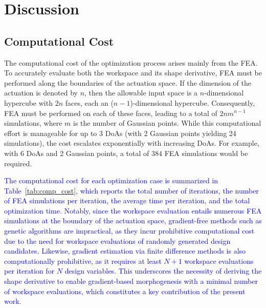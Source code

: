 \documentclass[journal]{IEEEtran}
\theoremstyle{definition}
\begin{document}
\section{Discussion}
\label{sec:discussion}

\subsection{Computational Cost}
\label{sec:discussion:cost}
The computational cost of the optimization process arises mainly from the FEA. To accurately evaluate both the workspace and its shape derivative, FEA must be performed along the boundaries of the actuation space. If the dimension of the actuation is denoted by \(n\), then the allowable input space is a \(n\)-dimensional hypercube with \(2n\) faces, each an ($n-1$)-dimensional hypercube. Consequently, FEA must be performed on each of these faces, leading to a total of \(2nm^{n-1}\) simulations, where \(m\) is the number of Gaussian points. While this computational effort is manageable for up to 3 DoAs (with 2 Gaussian points yielding 24 simulations), the cost escalates exponentially with increasing DoAs. For example, with 6 DoAs and 2 Gaussian points, a total of $384$ FEA simulations would be required.

\textcolor{blue}{The computational cost for each optimization case is summarized in Table~\ref{tab:comp_cost}, which reports the total number of iterations, the number of FEA simulations per iteration, the average time per iteration, and the total optimization time. Notably, since the workspace evaluation entails numerous FEA simulations at the boundary of the actuation space, gradient-free methods such as genetic algorithms are impractical, as they incur prohibitive computational cost due to the need for workspace evaluations of randomly generated design candidates. Likewise, gradient estimation via finite difference methods is also computationally prohibitive, as it requires at least $N{+}1$ workspace evaluations per iteration for $N$ design variables. This underscores the necessity of deriving the shape derivative to enable gradient-based morphogenesis with a minimal number of workspace evaluations, which constitutes a key contribution of the present work.}
\end{document}

